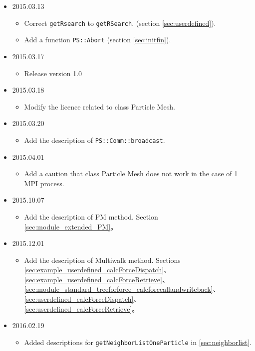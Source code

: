 \begin{itemize}
\item 2015.03.13
  \begin{itemize}
  \item Correct \texttt{getRsearch} to \texttt{getRSearch}. (section
    \ref{sec:userdefined}).
  \item Add a function \texttt{PS::Abort} (section \ref{sec:initfin}).
  \end{itemize}
\item 2015.03.17
  \begin{itemize}
  \item Release version 1.0
  \end{itemize}
\item 2015.03.18
  \begin{itemize}
  \item Modify the licence related to class Particle Mesh.
  \end{itemize}
\item 2015.03.20
  \begin{itemize}
  \item Add the description of \texttt{PS::Comm::broadcast}.
  \end{itemize}
\item 2015.04.01
  \begin{itemize}
  \item Add a caution that class Particle Mesh does not work in the
    case of 1 MPI process.
  \end{itemize}
  \item 2015.10.07
  \begin{itemize}
  \item Add the description of PM method. Section
    \ref{sec:module_extended_PM}。
  \end{itemize}
\item 2015.12.01
  \begin{itemize}
  \item Add the description of Multiwalk method. Sections
    \ref{sec:example_userdefined_calcForceDispatch}、
    \ref{sec:example_userdefined_calcForceRetrieve}、
    \ref{sec:module_standard_treeforforce_calcforceallandwriteback}、
    \ref{sec:userdefined_calcForceDispatch}、
    \ref{sec:userdefined_calcForceRetrieve}。
  \end{itemize}
\item 2016.02.19
  \begin{itemize}
  \item Added descriptions for \texttt{getNeighborListOneParticle} in 
    \ref{sec:neighborlist}.


\end{itemize}
\end{itemize}
